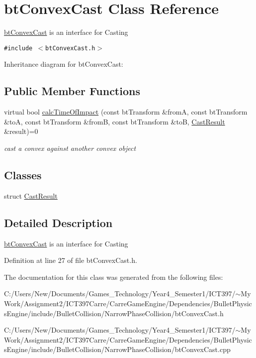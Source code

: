 \hypertarget{classbt_convex_cast}{
\section{btConvexCast Class Reference}
\label{classbt_convex_cast}
}
\hyperlink{classbt_convex_cast}{btConvexCast} is an interface for Casting  


{\tt \#include $<$btConvexCast.h$>$}

Inheritance diagram for btConvexCast:\subsection*{Public Member Functions}
\begin{CompactItemize}
\item 
\hypertarget{classbt_convex_cast_baf0f25a8cccfcafdaabada83c8d2bfb}{
virtual bool \hyperlink{classbt_convex_cast_baf0f25a8cccfcafdaabada83c8d2bfb}{calcTimeOfImpact} (const btTransform \&fromA, const btTransform \&toA, const btTransform \&fromB, const btTransform \&toB, \hyperlink{structbt_convex_cast_1_1_cast_result}{CastResult} \&result)=0}
\label{classbt_convex_cast_baf0f25a8cccfcafdaabada83c8d2bfb}

\begin{CompactList}\small\item\em cast a convex against another convex object \item\end{CompactList}\end{CompactItemize}
\subsection*{Classes}
\begin{CompactItemize}
\item 
struct \hyperlink{structbt_convex_cast_1_1_cast_result}{CastResult}
\end{CompactItemize}


\subsection{Detailed Description}
\hyperlink{classbt_convex_cast}{btConvexCast} is an interface for Casting 

Definition at line 27 of file btConvexCast.h.

The documentation for this class was generated from the following files:\begin{CompactItemize}
\item 
C:/Users/New/Documents/Games\_\-Technology/Year4\_\-Semester1/ICT397/$\sim$My Work/Assignment2/ICT397Carre/CarreGameEngine/Dependencies/BulletPhysicsEngine/include/BulletCollision/NarrowPhaseCollision/btConvexCast.h\item 
C:/Users/New/Documents/Games\_\-Technology/Year4\_\-Semester1/ICT397/$\sim$My Work/Assignment2/ICT397Carre/CarreGameEngine/Dependencies/BulletPhysicsEngine/include/BulletCollision/NarrowPhaseCollision/btConvexCast.cpp\end{CompactItemize}
